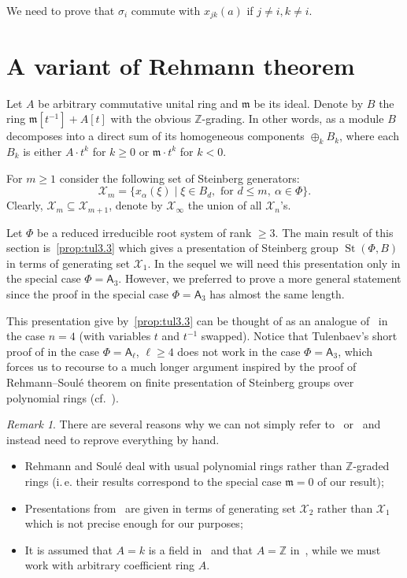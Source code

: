 \documentclass[oneside, 10pt]{amsart}
\DeclareMathOperator{\St}{St}
\newcommand{\rA}{\mathsf{A}}
\newcommand{\XX}[1]{\mathcal{X}_{#1}}
\numberwithin{equation}{section}
\numberwithin{lemma}{section}
\theoremstyle{definition}
\theoremstyle{remark}
\newtheorem{rem}[lemma]{Remark}
\begin{document}
We need to prove that $\sigma_i$ commute with $x_{jk}(a)$ if $j\neq i, k \neq i$.

\section{A variant of Rehmann theorem}
Let $A$ be arbitrary commutative unital ring and $\mathfrak{m}$ be its ideal.
Denote by $B$ the ring $\mathfrak{m}[t^{-1}] + A[t]$ with the obvious $\mathbb{Z}$-grading.
In other words, as a module $B$ decomposes into a direct sum of its homogeneous components $\oplus_k B_k$,
 where each $B_k$ is either $A\cdot t^k$ for $k \geq 0$ or $\mathfrak{m} \cdot t^k$ for $k<0$.
  
For $m \geq 1$ consider the following set of Steinberg generators:
\[\XX{m} = \{ x_{\alpha}(\xi) \mid \xi \in B_d,\text{ for } d\leq m,\ \alpha\in\Phi\}. \]
Clearly, $\XX{m} \subseteq \XX{m+1}$, denote by $\XX{\infty}$ the union of all $\XX{n}$'s.


Let $\Phi$ be a reduced irreducible root system of rank $\geq 3$.
The main result of this section is~\cref{prop:tul3.3} which gives a presentation of Steinberg group $\St(\Phi, B)$ in terms of generating set $\mathcal{X}_1$.
In the sequel we will need this presentation only in the special case $\Phi=\rA_3$. However, we preferred to prove a more general statement since the proof in the special case $\Phi=\rA_3$ has almost the same length.

This presentation give by~\cref{prop:tul3.3} can be thought of as an analogue of~\cite[Lemma~3.3]{Tu83} in the case $n=4$ (with variables $t$ and $t^{-1}$ swapped).
Notice that Tulenbaev's short proof of \cite[Lemma~3.3]{Tu83} in the case $\Phi=\rA_\ell$, $\ell\geq 4$ does not work in the case $\Phi=\rA_3$,
 which forces us to recourse to a much longer argument inspired by the proof of Rehmann--Soul{\'e} theorem on
 finite presentation of Steinberg groups over polynomial rings (cf.~\cite{Re75, RS76}).
 
\begin{rem}
There are several reasons why we can not simply refer to~\cite{Re75} or~\cite{RS76} and instead need to reprove everything by hand.
\begin{itemize}
 \item Rehmann and Soul{\'e} deal with usual polynomial rings rather than $\mathbb{Z}$-graded rings
  (i.\,e. their results correspond to the special case $\mathfrak{m}=0$ of our result);
 \item Presentations from~\cite{Re75,RS76} are given in terms of generating set $\XX{2}$ rather than $\mathcal{X}_1$ which is not precise enough for our purposes;
 \item It is assumed that $A=k$ is a field in~\cite{Re75} and that $A=\mathbb{Z}$ in~\cite{RS76}, while we must work with arbitrary coefficient ring $A$.
\end{itemize} 
\end{rem}
\end{document}
